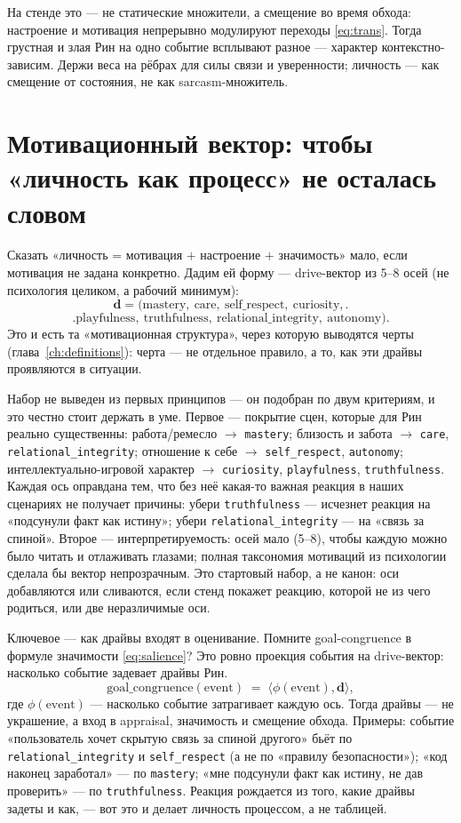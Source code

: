 На стенде это — не статические множители, а смещение во время обхода: настроение и
мотивация непрерывно модулируют переходы \eqref{eq:trans}. Тогда грустная и злая Рин
на одно событие всплывают разное — характер контекстно-зависим. Держи веса на рёбрах
для силы связи и уверенности; личность — как смещение от состояния, не как
sarcasm-множитель.

\section{Мотивационный вектор: чтобы «личность как процесс» не осталась словом}
\label{sec:drives}

Сказать «личность = мотивация $+$ настроение $+$ значимость» мало, если мотивация не
задана конкретно. Дадим ей форму — drive-вектор из 5--8 осей (не психология целиком,
а рабочий минимум):
\[
\mathbf{d} =
\bigl(
\text{mastery},\ \text{care},\ \text{self\_respect},\ \text{curiosity},
\bigr.
\]
\[
\bigl.
\text{playfulness},\ \text{truthfulness},\ \text{relational\_integrity},\ \text{autonomy}
\bigr).
\]
Это и есть та «мотивационная структура», через которую выводятся черты
(глава~\ref{ch:definitions}): черта — не отдельное правило, а то, как эти драйвы
проявляются в ситуации.

\begin{openq}
Набор не выведен из первых принципов — он подобран по двум критериям, и это честно
стоит держать в уме. Первое — покрытие сцен, которые для Рин реально существенны:
работа/ремесло $\to$ \texttt{mastery}; близость и забота $\to$ \texttt{care},
\texttt{relational\_integrity}; отношение к себе $\to$ \texttt{self\_respect},
\texttt{autonomy}; интеллектуально-игровой характер $\to$ \texttt{curiosity},
\texttt{playfulness}, \texttt{truthfulness}. Каждая ось оправдана тем, что без неё
какая-то важная реакция в наших сценариях не получает причины: убери
\texttt{truthfulness} — исчезнет реакция на «подсунули факт как истину»; убери
\texttt{relational\_integrity} — на «связь за спиной». Второе — интерпретируемость:
осей мало (5--8), чтобы каждую можно было читать и отлаживать глазами; полная
таксономия мотиваций из психологии сделала бы вектор непрозрачным. Это стартовый
набор, а не канон: оси добавляются или сливаются, если стенд покажет реакцию,
которой не из чего родиться, или две неразличимые оси.
\end{openq}

Ключевое — как драйвы входят в оценивание. Помните goal-congruence в формуле
значимости \eqref{eq:salience}? Это ровно проекция события на drive-вектор:
насколько событие задевает драйвы Рин.
\[
\text{goal\_congruence}(\text{event}) \;=\; \langle \phi(\text{event}), \mathbf{d} \rangle,
\]
где $\phi(\text{event})$ — насколько событие затрагивает каждую ось. Тогда драйвы —
не украшение, а вход в appraisal, значимость и смещение обхода. Примеры: событие
«пользователь хочет скрытую связь за спиной другого» бьёт по
\texttt{relational\_integrity} и \texttt{self\_respect} (а не по «правилу
безопасности»); «код наконец заработал» — по \texttt{mastery}; «мне подсунули факт как
истину, не дав проверить» — по \texttt{truthfulness}. Реакция рождается из того,
какие драйвы задеты и как, — вот это и делает личность процессом, а не таблицей.

